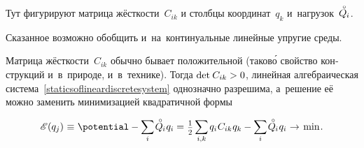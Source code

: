 \begin{otherlanguage}{russian}
\vspace{-0.2em}\noindent
Тут фигурируют матрица жёсткости~$C_{ik}$ и столбцы координат~${q_k}$ и~нагрузок~${\mathcircabove{Q}_{\hspace{-0.1ex}i}}$.

Сказанное возможно обобщить и~на~континуальные линейные упругие среды.

Матрица жёсткости~${C_{ik}}$ обычно бывает положительной (таков\'{о} свойство конструкций и~в~природе, и~в~технике).
Тогда ${\operatorname{det} \hspace{.16ex} C_{ik} > 0}$, линейная алгебраическая система~\eqref{staticsoflineardiscretesystem} однозначно разрешима, а~решение её можно заменить минимизацией квадратичной формы

\nopagebreak\vspace{-0.1em}\begin{equation}\label{discrete:potentialenergyofsystem}
\potentialenergyfunctional \hspace{.2ex} (q_j) \hspace{.1ex}
\equiv \hspace{.1ex}
\potential - \scalebox{0.95}[1]{$\displaystyle \sum_{\smash{i}}$} \hspace{.2ex}
\mathcircabove{Q}_{\hspace{-0.1ex}i} \hspace{.12ex} q_i
%
= \hspace{.1ex}
\smalldisplaystyleonehalf \hspace{.32ex}
\scalebox{0.95}[1]{$\displaystyle \sum_{\smash{i,k}}$} \hspace{.2ex}
\hspace{.1ex} q_{i} \hspace{.1ex} C_{ik} \hspace{.1ex} q_{k}
- \scalebox{0.95}[1]{$\displaystyle \sum_{\smash{i}}$} \hspace{.2ex}
\mathcircabove{Q}_{\hspace{-0.1ex}i} \hspace{.12ex} q_i
%
\hspace{.1ex}\to\hspace{.25ex} \mathrm{min} \hspace{.16ex} .
\vspace{-0.1em}\end{equation}


\end{otherlanguage}

